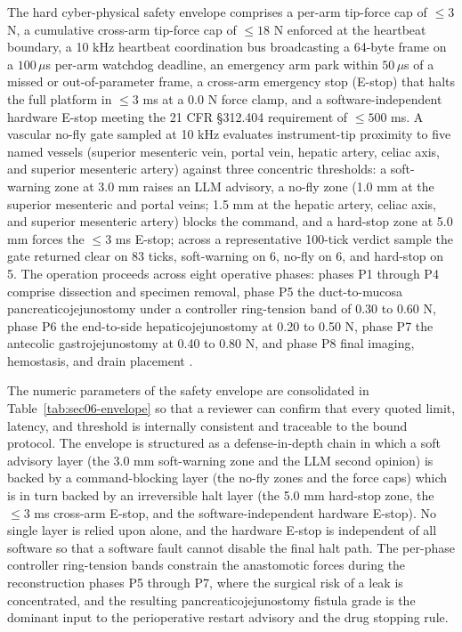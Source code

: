 The hard cyber-physical safety envelope comprises a per-arm tip-force cap of
$\leq 3$ N, a cumulative cross-arm tip-force cap of $\leq 18$ N enforced at the
heartbeat boundary, a 10 kHz heartbeat coordination bus broadcasting a 64-byte frame
on a $100\,\mu$s per-arm watchdog deadline, an emergency arm park within $50\,\mu$s
of a missed or out-of-parameter frame, a cross-arm emergency stop (E-stop) that
halts the full platform in $\leq 3$ ms at a 0.0 N force clamp, and a
software-independent hardware E-stop meeting the 21 CFR \S 312.404 requirement of
$\leq 500$ ms. A vascular no-fly gate sampled at 10 kHz evaluates instrument-tip
proximity to five named vessels (superior mesenteric vein, portal vein, hepatic
artery, celiac axis, and superior mesenteric artery) against three concentric
thresholds: a soft-warning zone at 3.0 mm raises an LLM advisory, a no-fly zone
(1.0 mm at the superior mesenteric and portal veins; 1.5 mm at the hepatic artery,
celiac axis, and superior mesenteric artery) blocks the command, and a hard-stop
zone at 5.0 mm forces the $\leq 3$ ms E-stop; across a representative 100-tick
verdict sample the gate returned clear on 83 ticks, soft-warning on 6, no-fly on 6,
and hard-stop on 5. The operation proceeds across eight operative phases: phases P1
through P4 comprise dissection and specimen removal, phase P5 the duct-to-mucosa
pancreaticojejunostomy under a controller ring-tension band of 0.30 to 0.60 N, phase
P6 the end-to-side hepaticojejunostomy at 0.20 to 0.50 N, phase P7 the antecolic
gastrojejunostomy at 0.40 to 0.80 N, and phase P8 final imaging, hemostasis, and
drain placement \cite{onpremwhippl}.

The numeric parameters of the safety envelope are consolidated in
Table~\ref{tab:sec06-envelope} so that a reviewer can confirm that every quoted
limit, latency, and threshold is internally consistent and traceable to the bound
protocol. The envelope is structured as a defense-in-depth chain in which a soft
advisory layer (the 3.0 mm soft-warning zone and the LLM second opinion) is backed
by a command-blocking layer (the no-fly zones and the force caps) which is in turn
backed by an irreversible halt layer (the 5.0 mm hard-stop zone, the $\leq 3$ ms
cross-arm E-stop, and the software-independent hardware E-stop). No single layer is
relied upon alone, and the hardware E-stop is independent of all software so that a
software fault cannot disable the final halt path. The per-phase controller
ring-tension bands constrain the anastomotic forces during the reconstruction phases
P5 through P7, where the surgical risk of a leak is concentrated, and the resulting
pancreaticojejunostomy fistula grade is the dominant input to the perioperative
restart advisory and the drug stopping rule.

